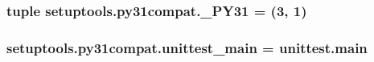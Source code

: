 \subsubsection[{\+\_\+\+P\+Y31}]{\setlength{\rightskip}{0pt plus 5cm}tuple setuptools.\+py31compat.\+\_\+\+P\+Y31 = (3, 1)}\label{namespacesetuptools_1_1py31compat_a00ac352ccd435ba5b5d678e9408df64e}
\hypertarget{namespacesetuptools_1_1py31compat_acb943bc1c3ff699123d78a6b23581c5b}{}
\subsubsection[{unittest\+\_\+main}]{\setlength{\rightskip}{0pt plus 5cm}setuptools.\+py31compat.\+unittest\+\_\+main = {\bf unittest.\+main}}\label{namespacesetuptools_1_1py31compat_acb943bc1c3ff699123d78a6b23581c5b}
